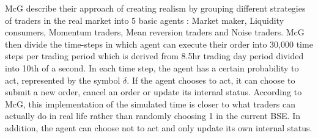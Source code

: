 McG describe their approach of creating realism by grouping different strategies of traders in the real market into 5 basic agents : Market maker, Liquidity consumers, Momentum traders, Mean reversion traders and Noise traders. McG then divide the time-steps in which agent can execute their order into 30,000 time steps per trading period which is derived from 8.5hr trading day period divided into 10th of a second. In each time step, the agent has a certain probability to act, represented by the symbol $\delta$. If the agent chooses to act, it can choose to submit a new order, cancel an order or update its internal status. According to McG, this implementation of the simulated time is closer to what traders can actually do in real life rather than randomly choosing 1 in the current BSE. In addition, the agent can choose not to act and only update its own internal status.




